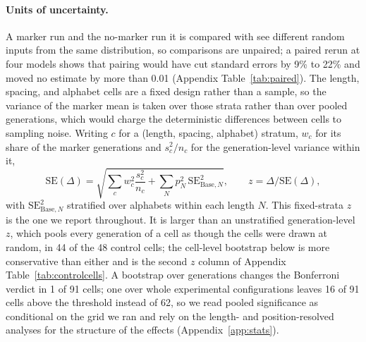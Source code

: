 \documentclass[10pt]{article} %
\begin{document}
\paragraph{Units of uncertainty.} A marker run and the no-marker run it is compared with see different random inputs from the same distribution, so comparisons are unpaired; a paired rerun at four models shows that pairing would have cut standard errors by 9\% to 22\% and moved no estimate by more than 0.01 (Appendix Table~\ref{tab:paired}). The length, spacing, and alphabet cells are a fixed design rather than a sample, so the variance of the marker mean is taken over those strata rather than over pooled generations, which would charge the deterministic differences between cells to sampling noise. Writing $c$ for a (length, spacing, alphabet) stratum, $w_c$ for its share of the marker generations and $s_c^2 / n_c$ for the generation-level variance within it,
\begin{equation}
\mathrm{SE}(\Delta) = \sqrt{\sum_c w_c^2 \frac{s_c^2}{n_c} + \sum_N p_N^2\,\mathrm{SE}_{\text{Base},N}^2}, \qquad z = \Delta / \mathrm{SE}(\Delta),
\label{eq:se}
\end{equation}
with $\mathrm{SE}^2_{\text{Base},N}$ stratified over alphabets within each length $N$. This fixed-strata $z$ is the one we report throughout. It is larger than an unstratified generation-level $z$, which pools every generation of a cell as though the cells were drawn at random, in 44 of the 48 control cells; the cell-level bootstrap below is more conservative than either and is the second $z$ column of Appendix Table~\ref{tab:controlcells}. A bootstrap over generations changes the Bonferroni verdict in 1 of 91 cells; one over whole experimental configurations leaves 16 of 91 cells above the threshold instead of 62, so we read pooled significance as conditional on the grid we ran and rely on the length- and position-resolved analyses for the structure of the effects (Appendix~\ref{app:stats}).
\end{document}
